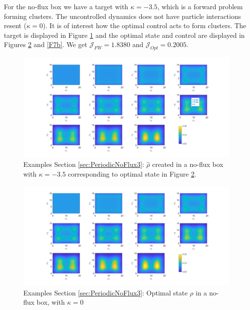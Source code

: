 \documentclass[11pt, a4paper]{article}
\theoremstyle{definition}
\newcommand{\hr}{\widehat \rho}
\begin{document}
For the no-flux box we have a target with $\kappa = -3.5$, which is a forward problem forming clusters. The uncontrolled dynamics does not have particle interactions resent ($\kappa =0$). It is of interest how the optimal control acts to form clusters. The target is displayed in Figure \ref{F7} and the optimal state and control are displayed in Figures \ref{F7a} and \ref{F7b}. We get $\mathcal J_{FW} = 1.8380$ and $\mathcal J_{Opt} = 0.2005$.
\begin{figure}[h]
	\centering
	\includegraphics[scale=0.35]{rhoHatPeri7.png}
	\caption{Examples Section \ref{sec:PeriodicNoFlux3}: $\hr$ created in a no-flux box with $\kappa = -3.5$ corresponding to optimal state in Figure \ref{F7a}.} 
	\label{F7}
\end{figure}
\begin{figure}[h]
	\centering
	\includegraphics[scale=0.35]{rhoOptPeri7.png}
	\caption{Examples Section \ref{sec:PeriodicNoFlux3}: Optimal state $\rho$ in a no-flux box, with $\kappa = 0$} 
	\label{F7a}
\end{figure}
\end{document}
